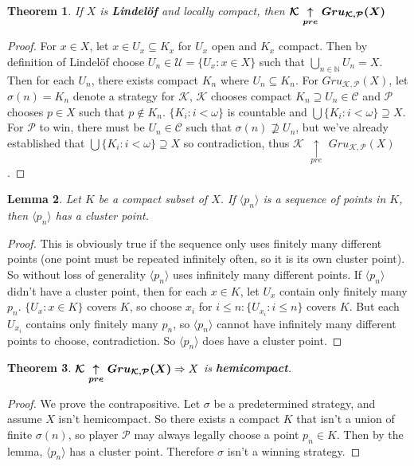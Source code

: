 \documentclass{amsart}
\theoremstyle{plain}
\newtheorem{theorem}{Theorem}
\newtheorem{lemma}[theorem]{Lemma}
\theoremstyle{definition}
\theoremstyle{remark}
\begin{document}
	\begin{theorem}
		If $X$ is \textbf{Lindel\"of} and locally compact, then $\boldsymbol{\mathcal{K}$ $\underset{pre}{\uparrow}$ $Gru_{\mathcal{K}, \mathcal{P}} (X)}$
	\end{theorem}
	\begin{proof}
		For $x \in X$, let $x \in U_x \subseteq K_x$ for $U_x$ open and $K_x$ compact. Then by definition of Lindel\"of choose $U_n \in \mathcal{U} = \lbrace U_x : x \in X \rbrace$ such that $\underset{n \in \mathbb{N}}{\bigcup}U_n = X$. Then for each $U_n$, there exists compact $K_n$ where $U_n \subseteq K_n$. \newline
		For $Gru_{\mathcal{K}, \mathcal{P}} (X)$, let $\sigma(n) = K_n$ denote a strategy for $\mathcal{K}$, $\mathcal{K}$ chooses compact $K_n \supseteq U_n \in \mathcal{C}$ and $\mathcal{P}$ chooses $p \in X$ such that $p \not\in K_n$. $\lbrace K_i : i < \omega \rbrace$ is countable and $\bigcup \lbrace K_i : i < \omega \rbrace \supseteq X$. For $\mathcal{P}$ to win, there must be $U_n \in \mathcal{C}$ such that $\sigma(n) \not\supseteq U_n$, but we've already established that $\bigcup \lbrace K_i : i < \omega \rbrace \supseteq X$ so contradiction, thus $\mathcal{K}$ $\underset{pre}{\uparrow}$ $Gru_{\mathcal{K}, \mathcal{P}} (X)$.
	\end{proof}

	\begin{lemma}
	Let $K$ be a compact subset of $X$. If $\langle p_n \rangle$ is a sequence of points in $K$, then $\langle p_n \rangle$ has a cluster point.
	\end{lemma}
	\begin{proof}
	This is obviously true if the sequence only uses finitely many different points (one point must be repeated infinitely often, so it is its own cluster point). So without loss of generality $\langle p_n \rangle$ uses infinitely many different points. If $\langle p_n \rangle$ didn't have a cluster point, then for each $x \in K$, let $U_x$ contain only finitely many $p_n$. $\lbrace U_x : x \in K \rbrace$ covers $K$, so choose $x_i$ for $i \leq n : \lbrace U_{x_i} : i \leq n \rbrace$ covers $K$. But each $U_{x_i}$ contains only finitely many $p_n$, so $\langle p_n \rangle$ cannot have infinitely many different points to choose, contradiction. So $\langle p_n \rangle$ does have a cluster point.
	\end{proof}

	\begin{theorem}
		$\boldsymbol{\mathcal{K}$ $\underset{pre}{\uparrow}$ $Gru_{\mathcal{K}, \mathcal{P}} (X)} \Rightarrow X$ is \textbf{hemicompact}.
	\end{theorem}
	\begin{proof}
		We prove the contrapositive. Let $\sigma$ be a predetermined strategy, and assume $X$ isn't hemicompact. So there exists a compact $K$ that isn't a union of finite $\sigma(n)$, so player $\mathcal{P}$ may always legally choose a point $p_n \in K$. Then by the lemma, $\langle p_n \rangle$ has a cluster point. Therefore $\sigma$ isn't a winning strategy.
	\end{proof}
\end{document}
